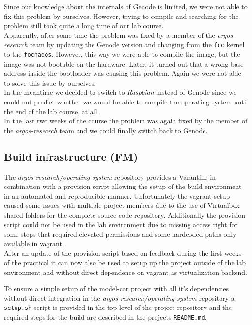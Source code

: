 Since our knowledge about the internals of Genode is limited, we were not able to fix this problem by ourselves. However, trying to compile and searching for the problem still took quite a long time of our lab course. \\

Apparently, after some time the problem was fixed by a member of the \textit{argos-research} team by updating the Genode version and changing from the \texttt{foc} kernel to the \texttt{focnados}. However, this way we were able to compile the image, but the image was not bootable on the hardware. Later, it turned out that a wrong base address inside the bootloader was causing this problem. Again we were not able to solve this issue by ourselves. \\

In the meantime we decided to switch to \textit{Raspbian} instead of Genode since we could not predict whether we would be able to compile the operating system until the end of the lab course, at all. \\

In the last two weeks of the course the problem was again fixed by the member of the \textit{argos-research} team and we could finally switch back to Genode.


\subsection{Build infrastructure (FM)}
The \textit{argos-research/operating-system} repository provides a Varantfile in combination with a provision script allowing the setup of the build environment in an automated and reproducible manner.
Unfortunately the vagrant setup caused some issues with multiple project members due to the use of Virtualbox shared folders for the complete source code repository.
Additionally the provision script could not be used in the lab environment due to missing access right for some steps that required elevated permissions and some hardcoded paths only available in vagrant. \\

After an update of the provision script based on feedback during the first weeks of the practical it can now also be used to setup up the project outside of the lab environment and without direct dependence on vagrant as virtualization backend.

To ensure a simple setup of the model-car project with all it's dependencies without direct integration in the \textit{argos-research/operating-system} repository a \texttt{setup.sh} script is provided in the top level of the project repository and the required steps for the build are described in the projects \texttt{README.md}.
